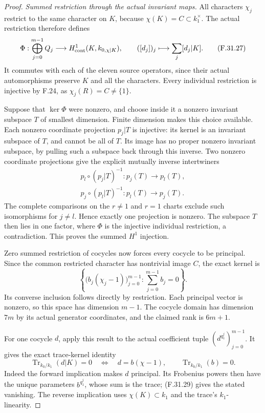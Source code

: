\begin{proof}
\emph{Summed restriction through the actual invariant maps.}
All characters $\chi_j$ restrict to
the same character on $K$, because
$\chi(K)=C\subset k_1^\times$.
The actual restriction therefore defines
\[
 \Phi:\bigoplus_{j=0}^{m-1}Q_j
  \longrightarrow H^1_{\rm cont}(K,k_{0,\chi|K}),\qquad
       ([d_j])_j\longmapsto\sum_j[d_j|K].
                                                               \tag{F.31.27}
\]
It commutes with each of the eleven
source operators, since their actual
automorphisms preserve $K$ and all
the characters. Every individual
restriction is injective by F.24,
as $\chi_j(R)=C\ne\{1\}$.

Suppose that $\ker\Phi$ were nonzero,
and choose inside it a nonzero invariant
subspace $T$ of smallest dimension.
Finite dimension makes this choice
available. Each nonzero coordinate
projection $p_j|T$ is injective:
its kernel is an invariant subspace
of $T$, and cannot be all of $T$.
Its image has no proper nonzero
invariant subspace, by pulling such
a subspace back through this inverse.
Two nonzero coordinate projections
give the explicit mutually inverse
intertwiners
\[
 \begin{gathered}
 p_l\circ(p_j|T)^{-1}:p_j(T)\longrightarrow p_l(T),\\
 p_j\circ(p_l|T)^{-1}:p_l(T)\longrightarrow p_j(T).
 \end{gathered}                                                \tag{F.31.28}
\]
The complete comparisons on the
$r\ne1$ and $r=1$ charts exclude
such isomorphisms for $j\ne l$.
Hence exactly one projection is
nonzero. The subspace $T$ then lies
in one factor, where $\Phi$ is the
injective individual restriction,
a contradiction. This proves the
summed $H^1$ injection.

Zero summed restriction of cocycles
now forces every cocycle to be
principal. Since the common restricted
character has nontrivial image $C$,
the exact kernel is
\[
 \left\{\bigl(b_j(\chi_j-1)\bigr)_{j=0}^{m-1}:
                      \sum_{j=0}^{m-1}b_j=0\right\}.
                                                               \tag{F.31.29}
\]
Its converse inclusion follows directly
by restriction. Each principal vector
is nonzero, so this space has dimension
$m-1$. The cocycle domain has dimension
$7m$ by its actual generator coordinates,
and the claimed rank is $6m+1$.

For one cocycle $d$, apply this result
to the actual coefficient tuple
$(d^{q_1^j})_{j=0}^{m-1}$.
It gives the exact trace-kernel identity
\[
 \operatorname{Tr}_{k_0/k_1}(d|K)=0
 \quad\Longleftrightarrow\quad
 d=b(\chi-1),\qquad
                    \operatorname{Tr}_{k_0/k_1}(b)=0.
                                                               \tag{F.31.30}
\]
Indeed the forward implication makes
$d$ principal. Its Frobenius powers
then have the unique parameters
$b^{q_1^j}$, whose sum is the trace;
(F.31.29) gives the stated vanishing.
The reverse implication uses
$\chi(K)\subset k_1$ and the trace's
$k_1$-linearity.


\end{proof}
